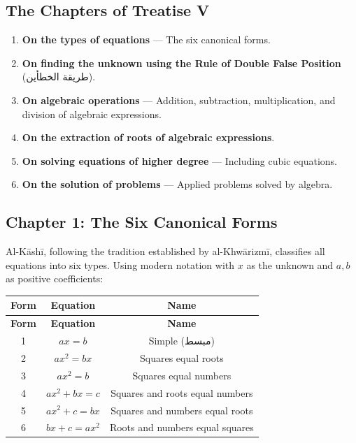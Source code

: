 \documentclass[11pt,a4paper]{article}
\newcommand{\ar}[1]{{\arabicfont\beginR #1\endR}}
\begin{document}
\subsection{The Chapters of Treatise V}

\begin{enumerate}[label=\textbf{Ch.\arabic*:}]
  \item \textbf{On the types of equations} --- The six canonical forms.
  \item \textbf{On finding the unknown using the Rule of Double False
  Position} (\ar{طريقة الخطأين}).
  \item \textbf{On algebraic operations} --- Addition, subtraction,
  multiplication, and division of algebraic expressions.
  \item \textbf{On the extraction of roots of algebraic expressions}.
  \item \textbf{On solving equations of higher degree} --- Including
  cubic equations.
  \item \textbf{On the solution of problems} --- Applied problems solved
  by algebra.
\end{enumerate}

\subsection{Chapter 1: The Six Canonical Forms}

Al-K\=ash\=i, following the tradition established by al-Khw\=arizm\=i,
classifies all equations into six types. Using modern notation with $x$
as the unknown and $a, b$ as positive coefficients:

\begin{longtable}{|c|c|c|}
\hline
\textbf{Form} & \textbf{Equation} & \textbf{Name} \\
\hline
\endfirsthead
\hline
\textbf{Form} & \textbf{Equation} & \textbf{Name} \\
\hline
\endhead
1 & $ax = b$ & Simple (\ar{مبسط}) \\
\hline
2 & $ax^2 = bx$ & Squares equal roots \\
\hline
3 & $ax^2 = b$ & Squares equal numbers \\
\hline
4 & $ax^2 + bx = c$ & Squares and roots equal numbers \\
\hline
5 & $ax^2 + c = bx$ & Squares and numbers equal roots \\
\hline
6 & $bx + c = ax^2$ & Roots and numbers equal squares \\
\hline
\end{longtable}
\end{document}
